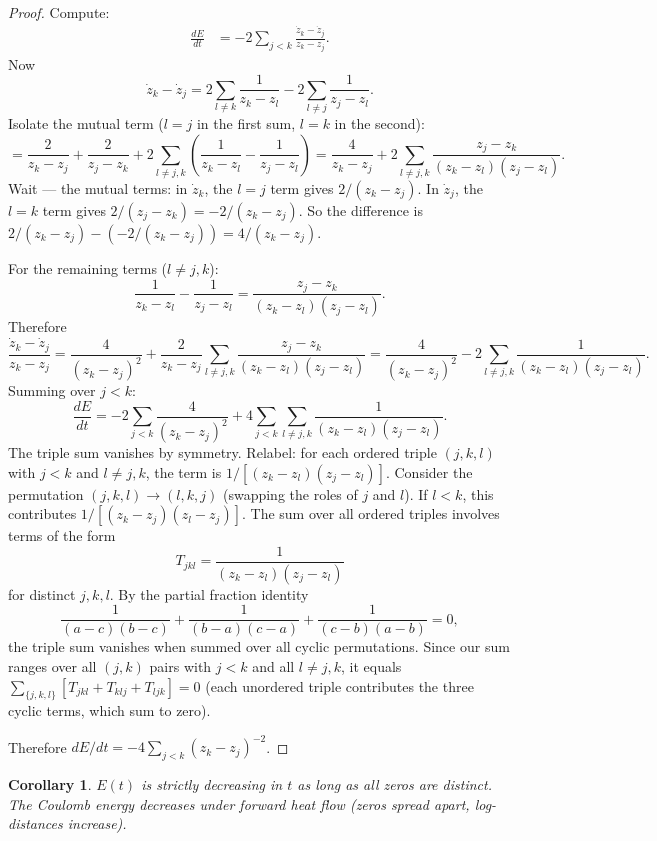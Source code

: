 \documentclass[11pt,a4paper]{article}
\newtheorem{corollary}{Corollary}
\begin{document}
\begin{proof}
Compute:
\begin{align*}
  \frac{dE}{dt}
  &= -2\sum_{j<k} \frac{\dot{z}_k - \dot{z}_j}{z_k - z_j}.
\end{align*}
Now
\[
  \dot{z}_k - \dot{z}_j
  = 2\sum_{l \neq k}\frac{1}{z_k - z_l}
  - 2\sum_{l \neq j}\frac{1}{z_j - z_l}.
\]
Isolate the mutual term ($l = j$ in the first sum, $l = k$ in
the second):
\[
  = \frac{2}{z_k - z_j} + \frac{2}{z_j - z_k}
  + 2\sum_{l \neq j,k}\left(\frac{1}{z_k - z_l} - \frac{1}{z_j - z_l}\right)
  = \frac{4}{z_k - z_j}
  + 2\sum_{l \neq j,k}\frac{z_j - z_k}{(z_k - z_l)(z_j - z_l)}.
\]
Wait --- the mutual terms: in $\dot{z}_k$, the $l=j$ term gives
$2/(z_k - z_j)$. In $\dot{z}_j$, the $l=k$ term gives
$2/(z_j - z_k) = -2/(z_k - z_j)$. So the difference is
$2/(z_k-z_j) - (-2/(z_k-z_j)) = 4/(z_k-z_j)$.

For the remaining terms ($l \neq j,k$):
\[
  \frac{1}{z_k - z_l} - \frac{1}{z_j - z_l}
  = \frac{z_j - z_k}{(z_k - z_l)(z_j - z_l)}.
\]
Therefore
\[
  \frac{\dot{z}_k - \dot{z}_j}{z_k - z_j}
  = \frac{4}{(z_k - z_j)^2}
  + \frac{2}{z_k - z_j}\sum_{l \neq j,k}
    \frac{z_j - z_k}{(z_k - z_l)(z_j - z_l)}
  = \frac{4}{(z_k - z_j)^2}
  - 2\sum_{l \neq j,k}\frac{1}{(z_k - z_l)(z_j - z_l)}.
\]
Summing over $j < k$:
\[
  \frac{dE}{dt} = -2\sum_{j<k}\frac{4}{(z_k-z_j)^2}
  + 4\sum_{j<k}\sum_{l\neq j,k}\frac{1}{(z_k-z_l)(z_j-z_l)}.
\]
The triple sum vanishes by symmetry. Relabel: for each
ordered triple $(j,k,l)$ with $j < k$ and $l \neq j,k$,
the term is $1/[(z_k-z_l)(z_j-z_l)]$. Consider the
permutation $(j,k,l) \to (l,k,j)$ (swapping the roles of
$j$ and $l$). If $l < k$, this contributes
$1/[(z_k-z_j)(z_l-z_j)]$. The sum over all ordered triples
involves terms of the form
\[
  T_{jkl} = \frac{1}{(z_k-z_l)(z_j-z_l)}
\]
for distinct $j,k,l$. By the partial fraction identity
\[
  \frac{1}{(a-c)(b-c)} + \frac{1}{(b-a)(c-a)} + \frac{1}{(c-b)(a-b)} = 0,
\]
the triple sum vanishes when summed over all cyclic
permutations. Since our sum ranges over all $(j,k)$ pairs
with $j < k$ and all $l \neq j,k$, it equals
$\sum_{\{j,k,l\}} [T_{jkl} + T_{klj} + T_{ljk}] = 0$
(each unordered triple contributes the three cyclic terms,
which sum to zero).

Therefore $dE/dt = -4\sum_{j<k} (z_k - z_j)^{-2}$.
\end{proof}

\begin{corollary}\label{cor:monotone}
  $E(t)$ is strictly decreasing in $t$ as long as all zeros
  are distinct. The Coulomb energy decreases under forward
  heat flow (zeros spread apart, log-distances increase).
\end{corollary}
\end{document}
